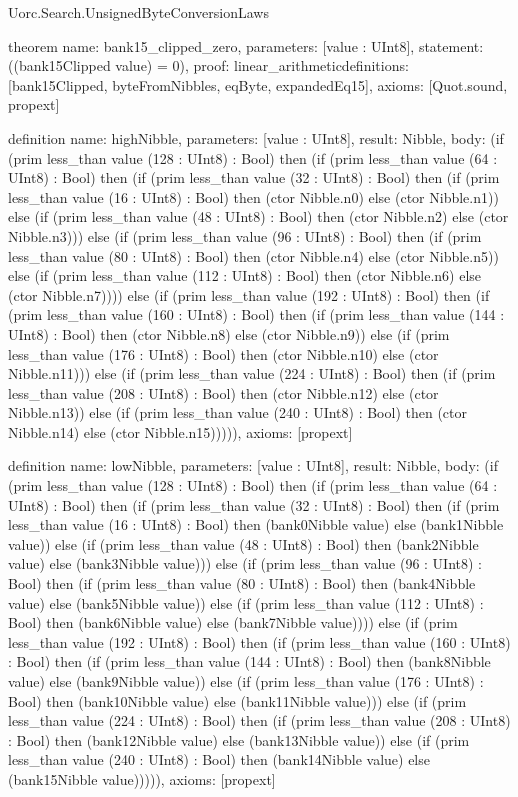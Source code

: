 \begin{lexlean}{Uorc.Search.UnsignedByteConversionLaws}
\begin{semanticmodule}
theorem{
  name: bank15_clipped_zero,
  parameters: [value : UInt8],
  statement: ((bank15Clipped value) = 0),
  proof: linear_arithmetic{definitions: [bank15Clipped, byteFromNibbles, eqByte, expandedEq15]},
  axioms: [Quot.sound, propext]
}

definition{
  name: highNibble,
  parameters: [value : UInt8],
  result: Nibble,
  body: (if (prim less_than value (128 : UInt8) : Bool) then (if (prim less_than value (64 : UInt8) : Bool) then (if (prim less_than value (32 : UInt8) : Bool) then (if (prim less_than value (16 : UInt8) : Bool) then (ctor Nibble.n0) else (ctor Nibble.n1)) else (if (prim less_than value (48 : UInt8) : Bool) then (ctor Nibble.n2) else (ctor Nibble.n3))) else (if (prim less_than value (96 : UInt8) : Bool) then (if (prim less_than value (80 : UInt8) : Bool) then (ctor Nibble.n4) else (ctor Nibble.n5)) else (if (prim less_than value (112 : UInt8) : Bool) then (ctor Nibble.n6) else (ctor Nibble.n7)))) else (if (prim less_than value (192 : UInt8) : Bool) then (if (prim less_than value (160 : UInt8) : Bool) then (if (prim less_than value (144 : UInt8) : Bool) then (ctor Nibble.n8) else (ctor Nibble.n9)) else (if (prim less_than value (176 : UInt8) : Bool) then (ctor Nibble.n10) else (ctor Nibble.n11))) else (if (prim less_than value (224 : UInt8) : Bool) then (if (prim less_than value (208 : UInt8) : Bool) then (ctor Nibble.n12) else (ctor Nibble.n13)) else (if (prim less_than value (240 : UInt8) : Bool) then (ctor Nibble.n14) else (ctor Nibble.n15))))),
  axioms: [propext]
}

definition{
  name: lowNibble,
  parameters: [value : UInt8],
  result: Nibble,
  body: (if (prim less_than value (128 : UInt8) : Bool) then (if (prim less_than value (64 : UInt8) : Bool) then (if (prim less_than value (32 : UInt8) : Bool) then (if (prim less_than value (16 : UInt8) : Bool) then (bank0Nibble value) else (bank1Nibble value)) else (if (prim less_than value (48 : UInt8) : Bool) then (bank2Nibble value) else (bank3Nibble value))) else (if (prim less_than value (96 : UInt8) : Bool) then (if (prim less_than value (80 : UInt8) : Bool) then (bank4Nibble value) else (bank5Nibble value)) else (if (prim less_than value (112 : UInt8) : Bool) then (bank6Nibble value) else (bank7Nibble value)))) else (if (prim less_than value (192 : UInt8) : Bool) then (if (prim less_than value (160 : UInt8) : Bool) then (if (prim less_than value (144 : UInt8) : Bool) then (bank8Nibble value) else (bank9Nibble value)) else (if (prim less_than value (176 : UInt8) : Bool) then (bank10Nibble value) else (bank11Nibble value))) else (if (prim less_than value (224 : UInt8) : Bool) then (if (prim less_than value (208 : UInt8) : Bool) then (bank12Nibble value) else (bank13Nibble value)) else (if (prim less_than value (240 : UInt8) : Bool) then (bank14Nibble value) else (bank15Nibble value))))),
  axioms: [propext]
}


\end{semanticmodule}
\end{lexlean}
